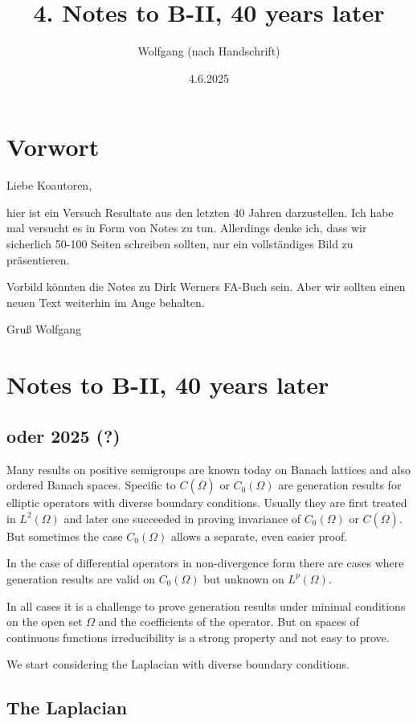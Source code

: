 \documentclass[11pt]{article}
\title{4. Notes to B-II, 40 years later}
\author{Wolfgang (nach Handschrift)}
\date{4.6.2025}
\begin{document}
\maketitle

\section*{Vorwort}

Liebe Koautoren,

hier ist ein Versuch Resultate aus den letzten 40 Jahren darzustellen. Ich habe mal versucht es in Form von Notes zu tun. Allerdings denke ich, dass wir sicherlich 50-100 Seiten schreiben sollten, nur ein vollständiges Bild zu präsentieren.

Vorbild könnten die Notes zu Dirk Werners FA-Buch sein. Aber wir sollten einen neuen Text weiterhin im Auge behalten.

Gruß
Wolfgang

\section{Notes to B-II, 40 years later}
\subsection*{oder 2025 (?)}

Many results on positive semigroups are known today on Banach lattices and also ordered Banach spaces. Specific to $C(\overline{\Omega})$ or $C_0(\Omega)$ are generation results for elliptic operators with diverse boundary conditions. Usually they are first treated in $L^2(\Omega)$ and later one succeeded in proving invariance of $C_0(\Omega)$ or $C(\overline{\Omega})$. But sometimes the case $C_0(\Omega)$ allows a separate, even easier proof.

In the case of differential operators in non-divergence form there are cases where generation results are valid on $C_0(\Omega)$ but unknown on $L^p(\Omega)$.

In all cases it is a challenge to prove generation results under minimal conditions on the open set $\Omega$ and the coefficients of the operator. But on spaces of continuous functions irreducibility is a strong property and not easy to prove.

We start considering the Laplacian with diverse boundary conditions.

\subsection{The Laplacian}
\end{document}
